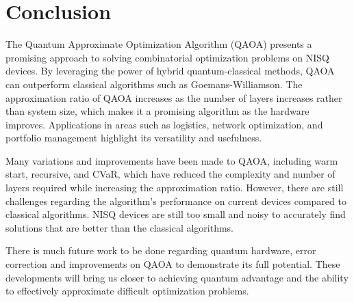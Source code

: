 \section{Conclusion}
The Quantum Approximate Optimization Algorithm (QAOA) presents a promising approach to solving combinatorial optimization problems on NISQ devices. By leveraging the power of hybrid quantum-classical methods, QAOA can outperform classical algorithms such as Goemans-Williamson. The approximation ratio of QAOA increases as the number of layers increases rather than system size, which makes it a promising algorithm as the hardware improves. Applications in areas such as logistics, network optimization, and portfolio management highlight its versatility and usefulness.

Many variations and improvements have been made to QAOA, including warm start, recursive, and CVaR, which have reduced the complexity and number of layers required while increasing the approximation ratio. However, there are still challenges regarding the algorithm's performance on current devices compared to classical algorithms. NISQ devices are still too small and noisy to accurately find solutions that are better than the classical algorithms. 

There is much future work to be done regarding quantum hardware, error correction and improvements on QAOA to demonstrate its full potential. These developments will bring us closer to achieving quantum advantage and the ability to effectively approximate difficult optimization problems.
